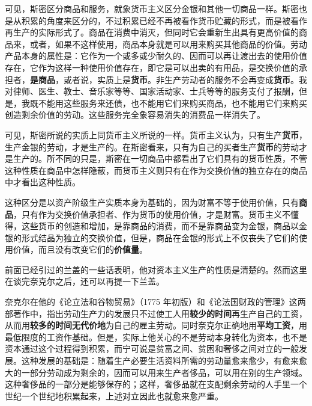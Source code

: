可见，斯密区分商品和服务，就象货币主义区分金银和其他一切商品一样。斯密也是从积累的角度来区分的，不过积累已经不再被看作货币贮藏的形式，而是被看作再生产的实际形式了。商品在消费中消灭，但同时它会重新生出具有更高价值的商品来，或者，如果不这样使用，商品本身就是可以用来购买其他商品的价值。劳动产品本身的属性是：它作为一个或多或少耐久的、因而可以再让渡出去的使用价值存在，它作为这样一种使用价值存在，即它是可以出卖的有用品，是交换价值的承担者，\textbf{是商品}，或者说，实质上是\textbf{货币}。非生产劳动者的服务不会再变成\textbf{货币}。我对律师、医生、教士、音乐家等等、国家活动家、士兵等等的服务支付了报酬，但是，我既不能用这些服务来还债，也不能用它们来购买商品，也不能用它们来购买创造剩余价值的劳动。这些服务完全象容易消失的消费品一样消失了。

可见，斯密所说的实质上同货币主义所说的一样。货币主义认为，只有生产\textbf{货币}，生产金银的劳动，才是生产的。在斯密看来，只有为自己的买者生产\textbf{货币}的劳动才是生产的。所不同的只是，斯密在一切商品中都看出了它们具有的货币性质，不管这种性质在商品中怎样隐蔽，而货币主义则只有在作为交换价值的独立存在的商品中才看出这种性质。

这种区分是以资产阶级生产实质本身为基础的，因为财富不等于使用价值，只有\textbf{商品}，只有作为交换价值承担者、作为货币的使用价值，才是财富。货币主义不懂得，这些货币的创造和增加，是靠商品的消费，而不是靠商品变为金银，商品以金银的形式结晶为独立的交换价值，但是，商品在金银的形式上不仅丧失了它们的使用价值，而且没有改变它们的\textbf{价值量}。



前面已经引过的兰盖的一些话表明，他对资本主义生产的性质是清楚的。然而这里在谈完奈克尔之后，还可以再提一下兰盖。

奈克尔在他的《论立法和谷物贸易》（1775 年初版）和《论法国财政的管理》这两部著作中，指出劳动生产力的发展只不过使工人用\textbf{较少的时间}再生产自己的工资，从而用\textbf{较多的时间无代价地}为自己的雇主劳动。同时奈克尔正确地用\textbf{平均工资}，用最低限度的工资作基础。但是，实际上他关心的不是劳动本身转化为资本，也不是资本通过这个过程得到积累，而宁可说是贫富之间、贫困和奢侈之间对立的一般发展。这种发展的基础是：随着生产必要生活资料所需的劳动量愈来愈少，有愈来愈大的一部分劳动成为剩余的，因而可以用来生产者侈品，可以用在别的生产领域。这种奢侈品的一部分是能够保存的；这样，奢侈品就在支配剩余劳动的人手里一个世纪一个世纪地积累起来，上述对立因此也就愈来愈严重。


